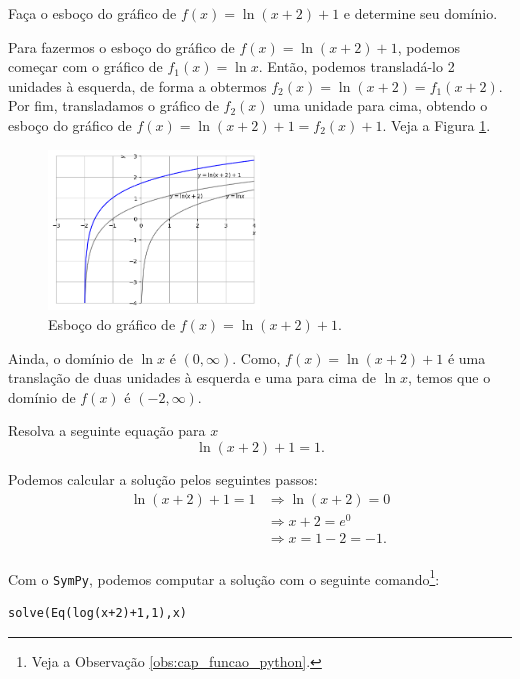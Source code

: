\begin{exeresol}
  Faça o esboço do gráfico de $f(x) = \ln(x+2)+1$ e determine seu domínio.
\end{exeresol}
\begin{resol}
  Para fazermos o esboço do gráfico de $f(x) = \ln(x+2)+1$, podemos começar com o gráfico de $f_1(x) = \ln x$. Então, podemos transladá-lo 2 unidades à esquerda, de forma a obtermos $f_2(x) = \ln(x+2) = f_1(x+2)$. Por fim, transladamos o gráfico de $f_2(x)$ uma unidade para cima, obtendo o esboço do gráfico de $f(x) = \ln(x+2)+1=f_2(x)+1$. Veja a Figura \ref{fig:exeresol_lograf}.

  \begin{figure}[H]
    \centering
    \includegraphics[width=0.5\textwidth]{./cap_funcao/dados/fig_exeresol_lograf/fig_exeresol_lograf}
    \caption{Esboço do gráfico de $f(x) = \ln(x+2)+1$.}
    \label{fig:exeresol_lograf}
  \end{figure}

Ainda, o domínio de $\ln x$ é $(0, \infty)$. Como, $f(x) = \ln(x+2)+1$ é uma translação de duas unidades à esquerda e uma para cima de $\ln x$, temos que o domínio de $f(x)$ é $(-2, \infty)$.
\end{resol}

\begin{exeresol}
  Resolva a seguinte equação para $x$
  \begin{equation}
    \ln(x+2) + 1 = 1. 
  \end{equation}
\end{exeresol}
\begin{resol}
  Podemos calcular a solução pelos seguintes passos:
  \begin{align}
    \ln(x+2)+1=1 &\Rightarrow \ln(x+2)=0\\
                 &\Rightarrow x+2=e^0\\
                 &\Rightarrow x=1-2=-1.\\
  \end{align}

  \ifispython
  Com o \verb+SymPy+, podemos computar a solução com o seguinte comando\footnote{Veja a Observação \ref{obs:cap_funcao_python}.}:
\begin{verbatim}
solve(Eq(log(x+2)+1,1),x)
\end{verbatim}
  \fi
\end{resol}

